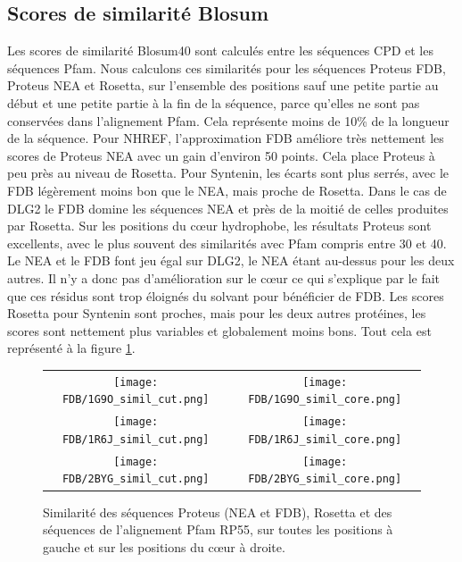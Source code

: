 \subsection{Scores de similarité Blosum}
Les scores de similarité Blosum40 sont calculés entre les séquences CPD et les séquences Pfam. Nous calculons ces similarités pour les séquences Proteus FDB, Proteus NEA et Rosetta, sur l'ensemble des positions sauf une petite partie au début et une petite partie à la fin de la séquence, parce qu'elles ne sont pas conservées dans l'alignement Pfam. Cela représente moins de 10\% de la longueur de la séquence. Pour NHREF, l'approximation FDB améliore très nettement les scores de Proteus NEA avec un gain d'environ 50 points. Cela place Proteus à peu près au niveau de Rosetta. Pour Syntenin, les écarts sont plus serrés, avec le FDB légèrement moins bon que le NEA, mais proche de Rosetta. Dans le cas de DLG2 le FDB domine les séquences NEA et près de la moitié de celles produites par Rosetta. Sur les positions du cœur hydrophobe, les résultats Proteus sont excellents, avec le plus souvent des similarités avec Pfam compris entre 30 et 40. Le NEA et le FDB font jeu égal sur DLG2, le NEA étant au-dessus pour les deux autres. Il n'y a donc pas d'amélioration sur le cœur ce qui s'explique par le fait que ces résidus sont trop éloignés du solvant pour bénéficier de FDB. Les scores Rosetta pour Syntenin sont proches, mais pour les deux autres protéines, les scores sont nettement plus variables et globalement moins bons. Tout cela est représenté à la figure  \ref{graph:Simil_3prot}.

   \begin{figure}[t]
     \centering
     \begin{tabular}{cc} 
       \texttt{[image: FDB/1G9O\_simil\_cut.png]} &
       \texttt{[image: FDB/1G9O\_simil\_core.png]} \\
       \texttt{[image: FDB/1R6J\_simil\_cut.png]} &
       \texttt{[image: FDB/1R6J\_simil\_core.png]} \\
       \texttt{[image: FDB/2BYG\_simil\_cut.png]} &
       \texttt{[image: FDB/2BYG\_simil\_core.png]} \\
     \end{tabular}
     \caption{Similarité des séquences Proteus (NEA et FDB), Rosetta et des séquences de l'alignement Pfam RP55, sur toutes les positions à gauche et sur les positions du cœur à droite.}

     \label{graph:Simil_3prot}
   \end{figure}

